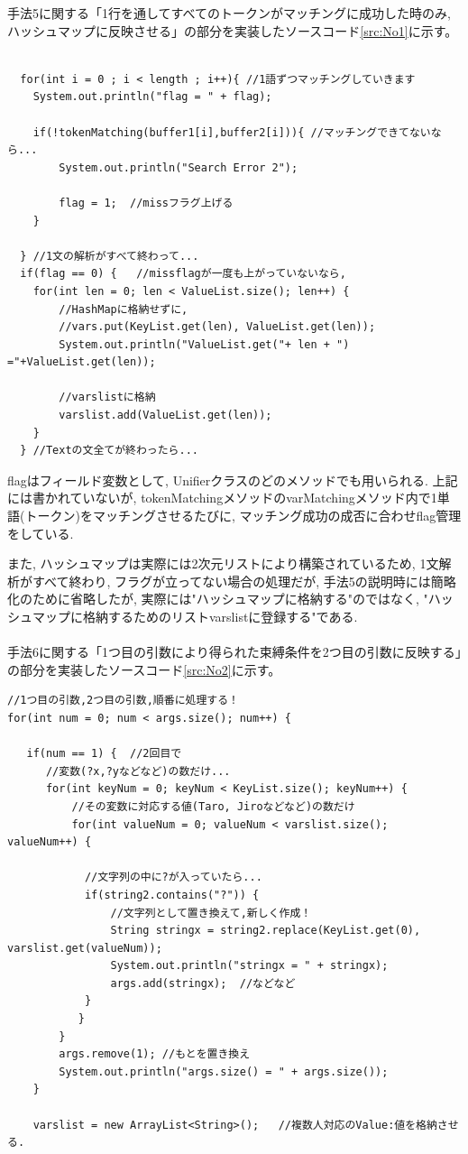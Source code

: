 \documentclass[12pt]{jarticle}
\begin{document}
手法5に関する「1行を通してすべてのトークンがマッチングに成功した時のみ, ハッシュマップに反映させる」の部分を実装したソースコード\ref{src:No1}に示す。
\begin{lstlisting}[caption=1文すべて終わったら格納する,label=src:No1]

  for(int i = 0 ; i < length ; i++){ //1語ずつマッチングしていきます
	System.out.println("flag = " + flag);

	if(!tokenMatching(buffer1[i],buffer2[i])){ //マッチングできてないなら...
		System.out.println("Search Error 2");

		flag = 1;  //missフラグ上げる
	}

  } //1文の解析がすべて終わって...
  if(flag == 0) {	//missflagが一度も上がっていないなら,
	for(int len = 0; len < ValueList.size(); len++) {
	    //HashMapに格納せずに,
	    //vars.put(KeyList.get(len), ValueList.get(len));
	    System.out.println("ValueList.get("+ len + ") ="+ValueList.get(len));

	    //varslistに格納
	    varslist.add(ValueList.get(len));
	}
  } //Textの文全てが終わったら...
\end{lstlisting}

flagはフィールド変数として, Unifierクラスのどのメソッドでも用いられる. 上記には書かれていないが, tokenMatchingメソッドのvarMatchingメソッド内で1単語(トークン)をマッチングさせるたびに, マッチング成功の成否に合わせflag管理をしている.

また, ハッシュマップは実際には2次元リストにより構築されているため, 1文解析がすべて終わり, フラグが立ってない場合の処理だが, 手法5の説明時には簡略化のために省略したが, 実際には"ハッシュマップに格納する"のではなく, "ハッシュマップに格納するためのリストvarslistに登録する"である.\\\\

手法6に関する「1つ目の引数により得られた束縛条件を2つ目の引数に反映する」の部分を実装したソースコード\ref{src:No2}に示す。

\begin{lstlisting}[caption=第1引数から第2引数への変数束縛条件の引継ぎ ,label=src:No2]
//1つ目の引数,2つ目の引数,順番に処理する！
for(int num = 0; num < args.size(); num++) {

   if(num == 1) {  //2回目で
      //変数(?x,?yなどなど)の数だけ...
      for(int keyNum = 0; keyNum < KeyList.size(); keyNum++) {
          //その変数に対応する値(Taro, Jiroなどなど)の数だけ
          for(int valueNum = 0; valueNum < varslist.size(); valueNum++) {

    		//文字列の中に?が入っていたら...
    		if(string2.contains("?")) {
    			//文字列として置き換えて,新しく作成！
    			String stringx = string2.replace(KeyList.get(0), varslist.get(valueNum));
    			System.out.println("stringx = " + stringx);
    			args.add(stringx);	//などなど
    		}
    	   }
    	}
    	args.remove(1); //もとを置き換え
    	System.out.println("args.size() = " + args.size());
    }	
     
    varslist = new ArrayList<String>();   //複数人対応のValue:値を格納させる.
\end{lstlisting}
\end{document}
